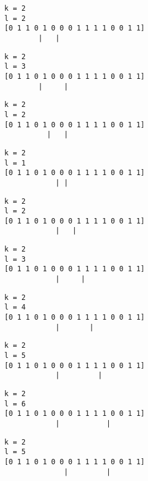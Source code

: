{ \begin{verbatim}
        k = 2
        l = 2
        [0 1 1 0 1 0 0 0 1 1 1 1 0 0 1 1]
                |   |
\end{verbatim} }

{ \begin{verbatim}
        k = 2
        l = 3
        [0 1 1 0 1 0 0 0 1 1 1 1 0 0 1 1]
                |     |
\end{verbatim} }

{ \begin{verbatim}
        k = 2
        l = 2
        [0 1 1 0 1 0 0 0 1 1 1 1 0 0 1 1]
                  |   |
\end{verbatim} }

{ \begin{verbatim}
        k = 2
        l = 1
        [0 1 1 0 1 0 0 0 1 1 1 1 0 0 1 1]
                    | |
\end{verbatim} }

{ \begin{verbatim}
        k = 2
        l = 2
        [0 1 1 0 1 0 0 0 1 1 1 1 0 0 1 1]
                    |   |
\end{verbatim} }

{ \begin{verbatim}
        k = 2
        l = 3
        [0 1 1 0 1 0 0 0 1 1 1 1 0 0 1 1]
                    |     |
\end{verbatim} }

{ \begin{verbatim}
        k = 2
        l = 4
        [0 1 1 0 1 0 0 0 1 1 1 1 0 0 1 1]
                    |       |
\end{verbatim} }

{ \begin{verbatim}
        k = 2
        l = 5
        [0 1 1 0 1 0 0 0 1 1 1 1 0 0 1 1]
                    |         |
\end{verbatim} }

{ \begin{verbatim}
        k = 2
        l = 6
        [0 1 1 0 1 0 0 0 1 1 1 1 0 0 1 1]
                    |           |
\end{verbatim} }

{ \begin{verbatim}
        k = 2
        l = 5
        [0 1 1 0 1 0 0 0 1 1 1 1 0 0 1 1]
                      |         |
\end{verbatim} }


